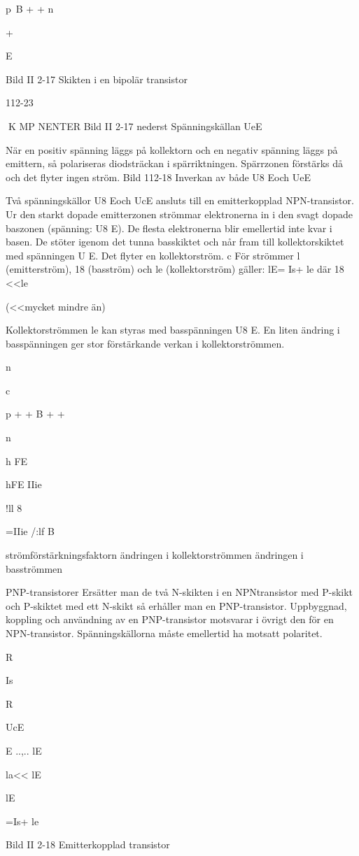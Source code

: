 {p~B
+ +
n

+

E

Bild II 2-17 Skikten i en bipolär transistor

112-23

K MP NENTER
Bild II 2-17 nederst
Spänningskällan UeE

När en positiv spänning läggs på kollektorn
och en negativ spänning läggs på emittern,
så polariseras diodsträckan i spärriktningen.
Spärrzonen förstärks då och det flyter ingen
ström.
Bild 112-18
Inverkan av både U8 Eoch UeE

Två spänningskällor U8 Eoch UcE ansluts till
en emitterkopplad NPN-transistor.
Ur den starkt dopade emitterzonen strömmar elektronerna in i den svagt dopade
baszonen (spänning: U8 E). De flesta elektronerna blir emellertid inte kvar i basen. De
stöter igenom det tunna basskiktet och når
fram till kollektorskiktet med spänningen U E.
Det flyter en kollektorström.
c
För strömmer l (emitterström), 18 (basström) och le (kollektorström) gäller:
lE= Is+ le där 18 <<le

(<<mycket mindre än)

Kollektorströmmen le kan styras med basspänningen U8 E.
En liten ändring i basspänningen ger stor
förstärkande verkan i kollektorströmmen.

n

c

p + + B
+ +

n

h
FE

hFE
IIie

!ll 8

=IIie
/:lf
B

strömförstärkningsfaktorn
ändringen i kollektorströmmen
ändringen i basströmmen

PNP-transistorer
Ersätter man de två N-skikten i en NPNtransistor med P-skikt och P-skiktet med ett
N-skikt så erhåller man en PNP-transistor.
Uppbyggnad, koppling och användning
av en PNP-transistor motsvarar i övrigt den
för en NPN-transistor. Spänningskällorna
måste emellertid ha motsatt polaritet.

R

Is

R

UcE

E
..,..
lE

la<< lE

lE

=Is+ le

Bild II 2-18 Emitterkopplad transistor

}
